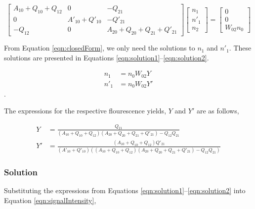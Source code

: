 \begin{equation}
  \left[
    \begin{matrix}
      A_{10} + Q_{10} + Q_{12} & 0 & -Q_{21}\\
      0 & A'_{10} + Q'_{10} & -Q'_{21}\\
      -Q_{12} & 0 & A_{20} + Q_{20} + Q_{21} + Q'_{21}
    \end{matrix}
  \right]\left[
    \begin{matrix}
      n_1\\
      n'_1\\
      n_2
    \end{matrix}
  \right] = \left[
    \begin{matrix}
      0\\
      0\\
      W_{02}n_0
    \end{matrix}
  \right]
  \label{eqn:closedForm}
\end{equation}

From Equation \ref{eqn:closedForm}, we only need the solutions to \(n_1\) and \(n'_1\).
These solutions are presented in Equations \ref{eqn:solution1}--\ref{eqn:solution2}.

\begin{align}
  n_1 &= n_0W_{02}Y
  \label{eqn:solution1}\\
  n'_1 &= n_0W_{02}Y'
  \label{eqn:solution2}
\end{align}.

The expressions for the respective flourescence yields, \(Y\) and \(Y'\) are as follows,

\begin{align}
  Y &= \frac{ Q_{21} }{ ( A_{10} + Q_{10} + Q_{12} )( A_{20} + Q_{20} + Q_{21} + Q'_{21} ) - Q_{12}Q_{21} }
  \label{eqn:flourescenceYield1-unsimplified}\\
  Y' &= \frac{ ( A_{10} + Q_{10} + Q_{12} )Q'_{21} }{ ( A'_{10} + Q'_{10} ) ( ( A_{10} + Q_{10} + Q_{12} )( A_{20} + Q_{20} + Q_{21} + Q'_{21} ) - Q_{12}Q_{21} ) }
  \label{eqn:fluorescenceYield2-unsimplified}
\end{align}

\subsubsection{Solution}
\label{subsubsec:improved-model-solution}

Substituting the expressions from Equations \ref{eqn:solution1}--\ref{eqn:solution2} into Equation \ref{eqn:signalIntensity},

